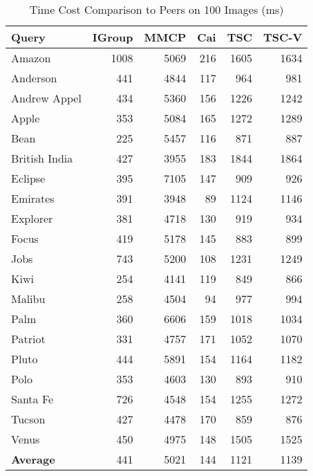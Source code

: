 \begin{table}[th]
\centering
\caption{Time Cost Comparison to Peers on 100 Images (ms)}
\small
\begin{tabular}{|l|r|r|r|r|r|}
\hline
{\bf Query} & {\bf IGroup} & {\bf MMCP} &  {\bf Cai} &  {\bf TSC} & {\bf TSC-V} \\
\hline
    Amazon &      1008  &      5069  &       216  &      1605  &      1634  \\
\hline
  Anderson &       441  &      4844  &       117  &       964  &       981  \\
\hline
Andrew Appel &       434  &      5360  &       156  &      1226  &      1242  \\
\hline
     Apple &       353  &      5084  &       165  &      1272  &      1289  \\
\hline
      Bean &       225  &      5457  &       116  &       871  &       887  \\
\hline
British India &       427  &      3955  &       183  &      1844  &      1864  \\
\hline
   Eclipse &       395  &      7105  &       147  &       909  &       926  \\
\hline
  Emirates &       391  &      3948  &        89  &      1124  &      1146  \\
\hline
  Explorer &       381  &      4718  &       130  &       919  &       934  \\
\hline
     Focus &       419  &      5178  &       145  &       883  &       899  \\
\hline
      Jobs &       743  &      5200  &       108  &      1231  &      1249  \\
\hline
      Kiwi &       254  &      4141  &       119  &       849  &       866  \\
\hline
    Malibu &       258  &      4504  &        94  &       977  &       994  \\
\hline
      Palm &       360  &      6606  &       159  &      1018  &      1034  \\
\hline
   Patriot &       331  &      4757  &       171  &      1052  &      1070  \\
\hline
     Pluto &       444  &      5891  &       154  &      1164  &      1182  \\
\hline
      Polo &       353  &      4603  &       130  &       893  &       910  \\
\hline
  Santa Fe &       726  &      4548  &       154  &      1255  &      1272  \\
\hline
    Tucson &       427  &      4478  &       170  &       859  &       876  \\
\hline
     Venus &       450  &      4975  &       148  &      1505  &      1525  \\
\hline
{\bf Average} &       441  &      5021  &       144  &      1121  &      1139  \\
\hline
\end{tabular}
\label{tab:timepeer}
\end{table}

